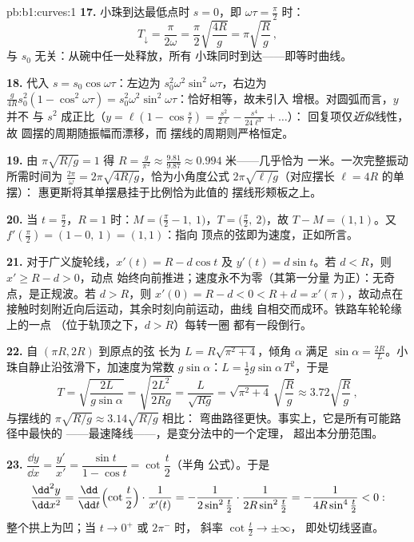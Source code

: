 \begin{solution}{pb:b1:curves:1}
\textbf{17.} 小珠到达最低点时 $s = 0$，即
$\omega\tau = \frac\pi2$ 时：
\[
T_{\downarrow} = \frac{\pi}{2\omega}
= \frac\pi2\sqrt{\frac{4R}{g}} = \pi\sqrt{\frac Rg}\,,
\]
与 $s_0$ 无关：从碗中任一处释放，所有
小珠同时到达——即等时曲线。

\textbf{18.} 代入 $s = s_0\cos\omega\tau$：左边为
$s_0^2\omega^2\sin^2\omega\tau$，右边为
$\frac{g}{4R}s_0^2(1 - \cos^2\omega\tau) =
s_0^2\omega^2\sin^2\omega\tau$：恰好相等，故未引入
增根。对圆弧而言，$y$ 并不
与 $s^2$ 成正比（$y = \ell(1 - \cos\frac s\ell) =
\frac{s^2}{2\ell} - \frac{s^4}{24\ell^3} + \dots$）：
回复项仅\emph{近似}线性，故
圆摆的周期随振幅而漂移，而
摆线的周期则严格恒定。

\textbf{19.} 由 $\pi\sqrt{R/g} = 1$ 得 $R = \frac{g}{\pi^2}
\approx \frac{9.81}{9.87} \approx 0.994$ 米——几乎恰为
一米。一次完整振动所需时间为 $\frac{2\pi}\omega =
2\pi\sqrt{4R/g}$，恰为小角度公式
$2\pi\sqrt{\ell/g}$（对应摆长 $\ell = 4R$ 的单摆）：
惠更斯将其单摆悬挂于比例恰为此值的
摆线形颊板之上。

\textbf{20.} 当 $t = \frac\pi2$，$R = 1$ 时：$M = \bigl(\frac\pi2 -
1,\ 1\bigr)$，$T = \bigl(\frac\pi2,\ 2\bigr)$，故 $T - M = (1,
1)$。又 $f'(\frac\pi2) = (1 - 0,\ 1) = (1, 1)$：指向
顶点的弦即为速度，正如所言。

\textbf{21.} 对于广义旋轮线，$x'(t) = R - d\cos t$ 及 $y'(t)
= d\sin t$。若 $d < R$，则 $x' \geq R - d > 0$，动点
始终向前推进；速度永不为零（其第一分量
为正）：无奇点，是正规波。若 $d > R$，则 $x'(0)
= R - d < 0 < R + d = x'(\pi)$，故动点在
接触时刻附近向后运动，其余时刻向前运动，曲线
自相交而成环。铁路车轮轮缘上的一点
（位于轨顶之下，$d > R$）每转一圈
都有一段倒行。

\textbf{22.} 自 $(\pi R, 2R)$ 到原点的弦
长为 $L = R\sqrt{\pi^2 + 4}$，倾角 $\alpha$ 满足
$\sin\alpha = \frac{2R}{L}$。小珠自静止沿弦滑下，加速度为常数
$g\sin\alpha$：$L = \frac12 g\sin\alpha\,T^2$，于是
\[
T = \sqrt{\frac{2L}{g\sin\alpha}} = \sqrt{\frac{2L^2}{2Rg}}
= \frac{L}{\sqrt{Rg}} = \sqrt{\pi^2 + 4}\,\sqrt{\frac Rg}
\approx 3.72\sqrt{\frac Rg}\,,
\]
与摆线的 $\pi\sqrt{R/g} \approx 3.14\sqrt{R/g}$ 相比：
弯曲路径更快。事实上，它是所有可能路径中最快的
——最速降线——，是变分法中的一个定理，
超出本分册范围。

\textbf{23.} $\dfrac{\dd y}{\dd x} = \dfrac{y'}{x'} =
\dfrac{\sin t}{1 - \cos t} = \cot\dfrac t2$（半角
公式）。于是
\[
\frac{\dd^2y}{\dd x^2}
= \frac{\dd}{\dd t}\Bigl(\cot\frac t2\Bigr)\cdot\frac{1}{x'(t)}
= -\frac{1}{2\sin^2\frac t2}\cdot\frac{1}{2R\sin^2\frac t2}
= -\frac{1}{4R\sin^4\frac t2} < 0 :
\]
整个拱上为凹；当 $t \to 0^+$ 或 $2\pi^-$ 时，
斜率 $\cot\frac t2 \to \pm\infty$，
即处切线竖直。


\end{solution}
